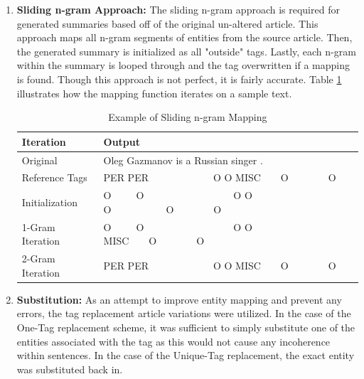 \documentclass[12pt]{report}
\begin{document}
            \begin{enumerate}
                \item \textbf{Sliding n-gram Approach:} The sliding n-gram approach is required for generated summaries based off of the original un-altered article. This approach maps all n-gram segments of entities from the source article. Then, the generated summary is initialized as all "outside" tags. Lastly, each n-gram within the summary is looped through and the tag overwritten if a mapping is found. Though this approach is not perfect, it is fairly accurate. Table \ref{tab:ngram_map} illustrates how the mapping function iterates on a sample text.
                
                \begin{table}[H]
                \begin{center}
                \begin{tabular}{|l|p{8cm}|}\hline
                    
                    \textbf{Iteration} & \textbf{Output}\\\hline
                    
                    Original & Oleg Gazmanov is a Russian singer .\\\hline
                    Reference Tags & PER PER\ \ \ \ \ \ \ \ \ \ \ \ \ O O MISC\ \ \ \ O\ \ \ \ \ \ \ \  O \\\hline
                    Initialization & O\ \ \ \ \ O\ \ \ \ \ \ \ \ \ \ \ \ \ \ \ \ \ \ O O O\ \ \ \ \ \ \ \ \ \ \ O\ \ \ \ \ \ \ \  O \\\hline
                    1-Gram Iteration & O\ \ \ \ \ O\ \ \ \ \ \ \ \ \ \ \ \ \ \ \ \ \ \ O O MISC\ \ \ \ O\ \ \ \ \ \ \ \  O \\\hline
                    2-Gram Iteration & PER PER\ \ \ \ \ \ \ \ \ \ \ \ \ O O MISC\ \ \ \ O\ \ \ \ \ \ \ \  O \\\hline
                    
                
                \end{tabular}
                \end{center}
                \caption{Example of Sliding n-gram Mapping}
                \label{tab:ngram_map}
                \end{table}
                
                
                \item \textbf{Substitution:} As an attempt to improve entity mapping and prevent any errors, the tag replacement article variations were utilized. In the case of the One-Tag replacement scheme, it was sufficient to simply substitute one of the entities associated with the tag as this would not cause any incoherence within sentences. In the case of the Unique-Tag replacement, the exact entity was substituted back in.
            \end{enumerate}
        
\end{document}
